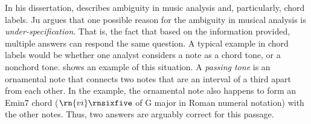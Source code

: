 

In his dissertation, \textcite{ju2021addressing} describes
ambiguity in music analysis and, particularly, chord labels.
Ju argues that one possible reason for the ambiguity in
musical analysis is \emph{under-specification}. That is, the
fact that based on the information provided, multiple
answers can respond the same question. A typical example in
chord labels would be whether one analyst considers a note
as a chord tone, or a nonchord tone. 
shows an example of this situation. A \emph{passing tone} is
an ornamental note that connects two notes that are an
interval of a third apart from each other. In the example,
the ornamental note also happens to form an Emin7 chord
($\rn{vi}\rnsixfive$ of G major in Roman numeral notation)
with the other notes. Thus, two answers are arguably correct
for this passage.

